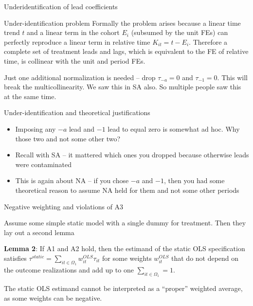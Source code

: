 \documentclass{beamer}
\begin{document}
\begin{frame}{Underidentification of lead coefficients}

\begin{block}{Under-identification problem}
Formally the problem arises because a linear time trend $t$ and a linear term in the cohort $E_i$ (subsumed by the unit FEs) can perfectly reproduce a linear term in relative time $K_{it}=t-E_i$.  Therefore a complete set of treatment leads and lags, which is equivalent to the FE of relative time, is collinear with the unit and period FEs.
\end{block}

\bigskip

Just one additional normalization is needed -- drop $\tau_{-a}=0$ and $\tau_{-1}=0$.  This will break the multicollinearity.  We saw this in SA also.  So multiple people saw this at the same time.

\end{frame}

\begin{frame}{Under-identification and theoretical justifications}

\begin{itemize}
\item Imposing any $-a$ lead and $-1$ lead to equal zero is somewhat ad hoc.  Why those two and not some other two?
\item Recall with SA -- it mattered which ones you dropped because otherwise leads were contaminated
\item This is again about NA -- if you chose $-a$ and $-1$, then you had some theoretical reason to assume NA held for them and not some other periods
\end{itemize}

\end{frame}



\begin{frame}{Negative weighting and violations of A3}

Assume some simple static model with a single dummy for treatment.  Then they lay out a second lemma

\bigskip 
\textbf{Lemma 2}: If A1 and A2 hold, then the estimand of the static OLS specification satisfies $\tau^{static}=\sum_{it \in \Omega_1} w_{it}^{OLS}\tau_{it}$ for some weights $w_{it}^{OLS}$ that do not depend on the outcome realizations and add up to one $\sum_{it \in \Omega_1}=1$.

\bigskip

The static OLS estimand cannot be interpreted as a ``proper'' weighted average, as some weights can be negative. 

\end{frame}
\end{document}
